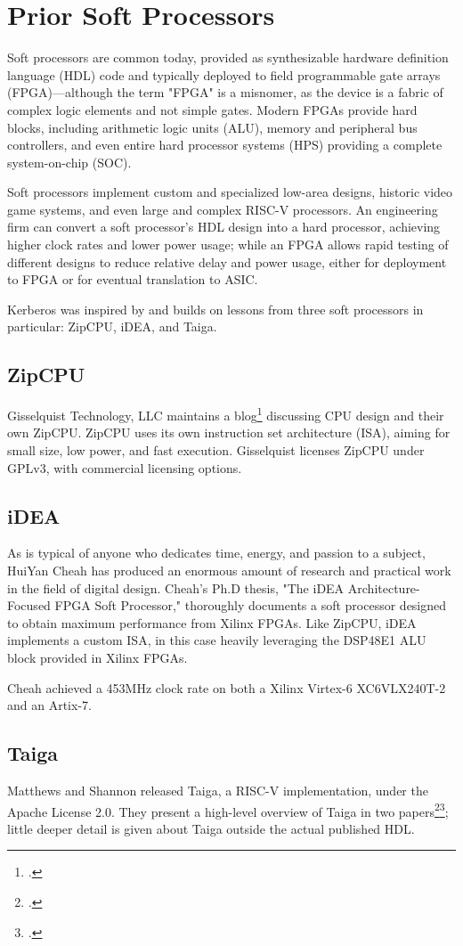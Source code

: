 \chapter{Prior Soft Processors}

Soft processors are common today, provided as synthesizable hardware definition
language (HDL) code and typically deployed to field programmable gate arrays
(FPGA)—although the term "FPGA" is a misnomer, as the device is a fabric of
complex logic elements and not simple gates.  Modern FPGAs provide hard blocks,
including arithmetic logic units (ALU), memory and peripheral bus controllers,
and even entire hard processor systems (HPS) providing a complete
system-on-chip (SOC).

Soft processors implement custom and specialized low-area designs, historic
video game systems, and even large and complex RISC-V processors.  An
engineering firm can convert a soft processor's HDL design into a hard
processor, achieving higher clock rates and lower power usage; while an FPGA
allows rapid testing of different designs to reduce relative delay and power
usage, either for deployment to FPGA or for eventual translation to ASIC.

Kerberos was inspired by and builds on lessons from three soft processors in
particular:  ZipCPU, iDEA, and Taiga.

\section{ZipCPU}

Gisselquist Technology, LLC maintains a blog\footcite{ZipCPU.Blog} discussing
CPU design and their own ZipCPU.  ZipCPU uses its own instruction set
architecture (ISA), aiming for small size, low power, and fast execution.
Gisselquist licenses ZipCPU under GPLv3, with commercial licensing options.

\section{iDEA}

As is typical of anyone who dedicates time, energy, and passion to a subject,
HuiYan Cheah has produced an enormous amount of research and practical work in
the field of digital design.  Cheah's Ph.D thesis, "The iDEA
Architecture-Focused FPGA Soft Processor," thoroughly documents a soft
processor designed to obtain maximum performance from Xilinx FPGAs.  Like
ZipCPU, iDEA implements a custom ISA, in this case heavily leveraging the
DSP48E1 ALU block provided in Xilinx FPGAs.

Cheah achieved a 453MHz clock rate on both a Xilinx Virtex-6 XC6VLX240T-2 and
an Artix-7.

\section{Taiga}

Matthews and Shannon released Taiga, a RISC-V implementation, under the Apache
License 2.0.  They present a high-level overview of Taiga in two
papers\footcite{Matthews2017}\footcite{Matthews2017b}; little deeper detail is
given about Taiga outside the actual published HDL.

